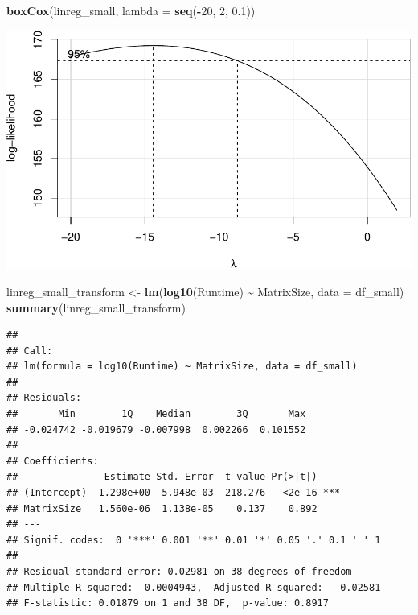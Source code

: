 \documentclass[
]{article}
\newenvironment{Shaded}{\begin{snugshade}}{\end{snugshade}}
\newcommand{\DataTypeTok}[1]{\textcolor[rgb]{0.13,0.29,0.53}{#1}}
\newcommand{\DecValTok}[1]{\textcolor[rgb]{0.00,0.00,0.81}{#1}}
\newcommand{\FloatTok}[1]{\textcolor[rgb]{0.00,0.00,0.81}{#1}}
\newcommand{\KeywordTok}[1]{\textcolor[rgb]{0.13,0.29,0.53}{\textbf{#1}}}
\newcommand{\NormalTok}[1]{#1}
\newcommand{\OperatorTok}[1]{\textcolor[rgb]{0.81,0.36,0.00}{\textbf{#1}}}
\newcommand{\StringTok}[1]{\textcolor[rgb]{0.31,0.60,0.02}{#1}}
\begin{document}
\begin{Shaded}
\begin{Highlighting}[]
\KeywordTok{boxCox}\NormalTok{(linreg\_small, }\DataTypeTok{lambda =} \KeywordTok{seq}\NormalTok{(}\OperatorTok{{-}}\DecValTok{20}\NormalTok{, }\DecValTok{2}\NormalTok{, }\FloatTok{0.1}\NormalTok{))}
\end{Highlighting}
\end{Shaded}

\includegraphics{main_files/figure-latex/unnamed-chunk-17-2.pdf}

\begin{Shaded}
\begin{Highlighting}[]
\NormalTok{linreg\_small\_transform \textless{}{-}}\StringTok{ }\KeywordTok{lm}\NormalTok{(}\KeywordTok{log10}\NormalTok{(Runtime) }\OperatorTok{\textasciitilde{}}\StringTok{ }\NormalTok{MatrixSize, }\DataTypeTok{data =}\NormalTok{ df\_small)}
\KeywordTok{summary}\NormalTok{(linreg\_small\_transform)}
\end{Highlighting}
\end{Shaded}

\begin{verbatim}
## 
## Call:
## lm(formula = log10(Runtime) ~ MatrixSize, data = df_small)
## 
## Residuals:
##       Min        1Q    Median        3Q       Max 
## -0.024742 -0.019679 -0.007998  0.002266  0.101552 
## 
## Coefficients:
##               Estimate Std. Error  t value Pr(>|t|)    
## (Intercept) -1.298e+00  5.948e-03 -218.276   <2e-16 ***
## MatrixSize   1.560e-06  1.138e-05    0.137    0.892    
## ---
## Signif. codes:  0 '***' 0.001 '**' 0.01 '*' 0.05 '.' 0.1 ' ' 1
## 
## Residual standard error: 0.02981 on 38 degrees of freedom
## Multiple R-squared:  0.0004943,  Adjusted R-squared:  -0.02581 
## F-statistic: 0.01879 on 1 and 38 DF,  p-value: 0.8917
\end{verbatim}
\end{document}
